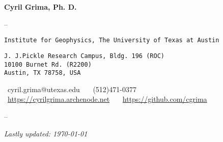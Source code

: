 \begin{center}

{\LARGE \textbf{Cyril Grima, Ph. D.}}
\vspace{.5em}

\hspace{0pt}{\large Research Associate}

--

\noindent\hspace{0pt}\texttt{Institute for Geophysics, The University of Texas at Austin}

\noindent\hspace{0pt}\texttt{J. J.Pickle Research Campus, Bldg. 196 (ROC)\\10100 Burnet Rd. (R2200)\\Austin, TX 78758, USA}
\vspace{.5em}

\noindent\hspace{0pt}\faInbox \ cyril.grima@utexas.edu \ \ \faPhone \ (512)471-0377 \\
\faDesktop \ \href{https://cyrilgrima.archenode.net}{https://cyrilgrima.archenode.net} \ \ \faGithub \ \href{https://github.com/cgrima}{https://github.com/cgrima}

--

\textit{Lastly updated: \today}

\end{center}
\vspace{-1em}